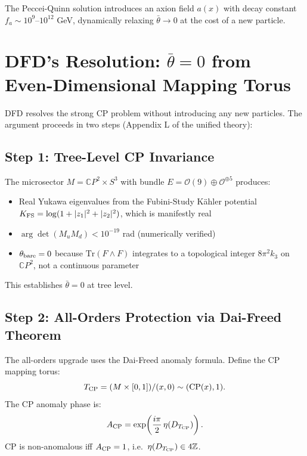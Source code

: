 \documentclass[11pt]{article}
\theoremstyle{remark}
\begin{document}
The Peccei-Quinn solution introduces an axion field $a(x)$ with decay constant
$f_a \sim 10^{9}\text{--}10^{12}$ GeV, dynamically relaxing $\bar\theta \to 0$
at the cost of a new particle.

\section{DFD's Resolution: $\bar\theta = 0$ from Even-Dimensional Mapping Torus}

DFD resolves the strong CP problem without introducing any new particles.  The
argument proceeds in two steps (Appendix L of the unified theory):

\subsection{Step 1: Tree-Level CP Invariance}

The microsector $M = \mathbb{C}P^2 \times S^3$ with bundle $E = \mathcal{O}(9)
\oplus \mathcal{O}^{\oplus 5}$ produces:
\begin{itemize}
\item Real Yukawa eigenvalues from the Fubini-Study K\"ahler potential
  $K_{\rm FS} = \log(1 + |z_1|^2 + |z_2|^2)$, which is manifestly real
\item $\arg\det(M_u M_d) < 10^{-19}$ rad (numerically verified)
\item $\theta_{\rm bare} = 0$ because $\mathrm{Tr}(F \wedge F)$
  integrates to a topological integer $8\pi^2 k_3$ on $\mathbb{C}P^2$, not a
  continuous parameter
\end{itemize}
This establishes $\bar\theta = 0$ at tree level.

\subsection{Step 2: All-Orders Protection via Dai-Freed Theorem}

The all-orders upgrade uses the Dai-Freed anomaly formula.  Define the CP
mapping torus:
\begin{equation}
T_{\rm CP} = (M \times [0,1]) / (x,0) \sim (\mathrm{CP}(x), 1).
\end{equation}
The CP anomaly phase is:
\begin{equation}
A_{\rm CP} = \exp\!\left(\frac{i\pi}{2}\,
  \eta(D_{T_{\rm CP}})\right).
\end{equation}
CP is non-anomalous iff $A_{\rm CP} = 1$, i.e.\ $\eta(D_{T_{\rm CP}}) \in 4\mathbb{Z}$.
\end{document}
